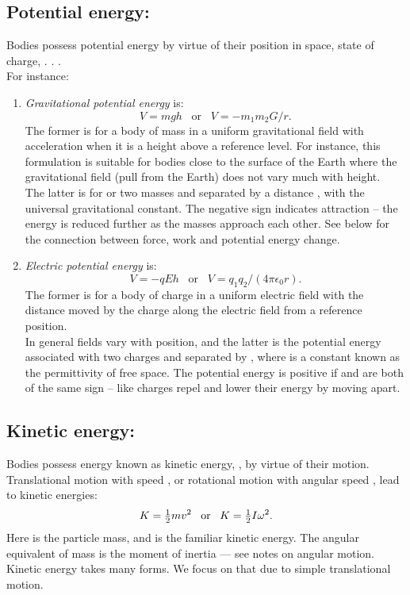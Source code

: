 \subsection{Potential energy:}Bodies possess potential energy by virtue of their position in space, state of charge, . . .\\
For instance:
\begin{enumerate}
  \item \textit{Gravitational potential energy} is:
\begin{equation*} 
    V = m g h \;\;\; \text{or} \;\;\; V = - m_1m_2 G/r.
\end{equation*}
The former is for a body of mass  in a uniform gravitational field with acceleration  when it is a height  above a reference level.  For instance, this formulation is suitable for bodies close to the surface of the Earth where the gravitational field (pull from the Earth) does not vary much with height.\\
The latter is for or two masses  and  separated by a distance , with  the universal gravitational constant.  The negative sign indicates attraction -- the energy is reduced further as the masses approach each other.  See below for the connection between force, work and potential energy change.
  \item \textit{Electric potential energy} is:
   \begin{equation*} 
   V = - q E h \;\;\; \text{or} \;\;\; V = q_1q_2/(4\pi \epsilon_0 r).
\end{equation*} 
The former is for a body of charge  in a uniform electric field  with  the distance moved by the charge along the electric field from a reference position.\\
In general fields vary with position, and the latter is the potential energy associated with two charges  and  separated by , where  is a constant known as the permittivity of free space.  The potential energy is positive if  and  are both of the same sign -- like charges repel and lower their energy by moving apart.
\end{enumerate}
\subsection{Kinetic energy:}  Bodies possess energy known as kinetic energy, , by virtue of their motion.  Translational motion with speed , or rotational motion with angular speed \vari{\omega}, lead to kinetic energies:
 \begin{equation*} K = {\textstyle \frac{1}{2}} m v^2 \;\;\; \text{or} \;\;\; K = {\textstyle \frac{1}{2}} I \omega^2.
\end{equation*}
Here  is the particle mass, and  is the familiar kinetic energy.  The angular equivalent of mass is the moment of inertia   --- see notes on angular motion.  Kinetic energy takes many forms.  We focus on that due to simple translational motion.


